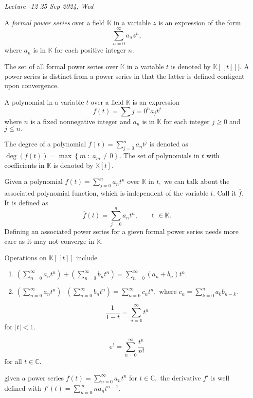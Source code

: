 
\noindent
\emph{Lecture -12 \hfill 25 Sep 2024, Wed}

\begin{definition}
	A \emph{formal power series} over a field $\mathbb{K}$ in a variable $z$
	is an expression of the form
	$$ \sum_{n=0}^{\infty} a_n z^n,$$
	where $a_n$ is in $\mathbb{K}$ for each positive integer $n.$
\end{definition}
The set of all formal power series over $\mathbb{K}$ 
in a variable $t$ is denoted by $ \mathbb{K} [[t]]].$
A power series is distinct from a power series in that the latter is defined contigent
upon convergence.

\begin{definition}[Polynomial]
	A polynomial in a variable $t$ over a field $\mathbb{K}$ is an expression
	$$ f(t) = \sum{j=0}^{n} a_j t^j $$
	where $n$ is a fixed nonnegative integer and $a_n$ is in $\mathbb{K}$ for each integer $j \geq 0$ and $j \leq n.$
\end{definition}


The degree of a polynomial $f(t) = \sum_{j=0}^{n} a_n t^j$ is denoted as
$\deg(f(t)) = \max \left\{ m \; : \; a_m \not = 0 \right\}.$ The set of polynomials in $t$
with coefficients in $\mathbb{K}$ is denoted by $\mathbb{K} [t].$

Given a polynomial $f(t) = \sum_{j=0}^{n}  a_n t^n$ over $\mathbb{K}$ in $t,$ we can talk
about the associated polynomial function, which is independent of the variable $t.$
Call it $\overline{f}.$ It is defined as 
$$ \overline{f} (t) = \sum_{j=0}^{n} a_n t^n, \qquad \text{t } \in \mathbb{K} .$$
Defining an associated power series for a gievn formal power series needs more care
as it may not converge in $\mathbb{K}.$

Operations on $\mathbb{K} [[t]]$ include
\begin{enumerate}
	\item $ \left( \sum_{n=0}^{\infty} a_n t^n \right) 
	+ \left( \sum_{n=0}^{\infty} b_n t^n \right) 
	= \sum_{n=0}^{\infty} (a_n + b_n ) t^n.$
	\item$ \left( \sum_{n=0}^{\infty} a_n t^n \right) 
		\cdot \left( \sum_{n=0}^{\infty} b_n t^n \right) 
		 = \sum_{n=0}^{\infty} c_n t^n,$ 
		 where $c_n = \sum_{k=0}^{n} a_k b_{n-k}.$
\end{enumerate}
\begin{example}
	$$ \frac{1}{1-t} = \sum_{n=0}^{\infty}  t^n $$
	for $ \lvert t \rvert < 1.$
\end{example}

\begin{example}
	$$ e^t = \sum_{n=0}^{\infty} \frac{t^n}{n!} $$
	for all $t \in \mathbb{C}.$
\end{example}

\begin{example}
	given a power series $f(t) = \sum_{n=0}^{\infty} a_n t^n$ for $t \in \mathbb{C},$
	the derivative $f'$ is well defined with
	$f'(t) = \sum_{n=0}^{\infty} n a_n t^{n-1} .$
\end{example}


